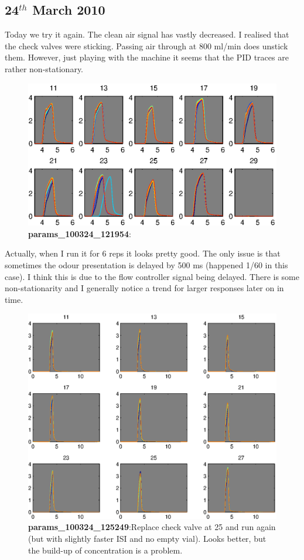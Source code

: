 \documentclass[a4paper]{report}
\begin{document}
\clearpage
\subsection{24$^{th}$ March 2010}
\label{stickingValves}
Today we try it again. The clean air signal has vastly decreased. I
realised that the check valves were sticking. Passing air through at
800 ml/min does unstick them. However, just playing with the machine
it seems that the PID traces are rather non-stationary. 
\begin{figure}[h]
\centering
\includegraphics[width=5in]{params_100324_121954.eps}
\caption{\textbf{params\_100324\_121954}:}
\end{figure}
Actually, when I run it for 6 reps it looks pretty good.  The only
issue is that sometimes the odour presentation is delayed by 500 ms
(happened 1/60 in this case). I think this is due to the flow
controller signal being delayed. There is some non-stationarity and I
generally notice a trend for larger responses later on in time.


\begin{figure}
\centering
\includegraphics[width=5in]{params_100324_125249.eps}
\caption{\textbf{params\_100324\_125249}:Replace check valve at 25 and
  run again (but with slightly faster ISI and no empty vial). Looks
  better, but the build-up of concentration is a problem. }
\end{figure}
\end{document}
